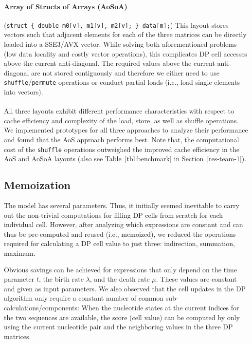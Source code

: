 \documentclass[runningheads,a4paper]{llncs}
\begin{document}
\paragraph*{Array of Structs of Arrays (AoSoA)} ({\small\texttt{struct \{ double m0[v],
m1[v], m2[v]; \} data[m];}}) This layout stores vectors such that
adjacent elements for each of the three matrices can be directly loaded into a SSE3/AVX vector. 
While solving both aforementioned problems (low data locality and costly vector operations),
this complicates DP cell accesses above the current anti-diagonal.
The required values above the current anti-diagonal are not stored contiguously 
and therefore we either need to use \texttt{shuffle}/\texttt{permute} operations
or conduct partial loads (i.e., load single elements into vectors).

\paragraph*{} All three layouts exhibit different performance characteristics with respect to
cache efficiency and complexity of the load, store, as well as shuffle operations.
We implemented prototypes for all three approaches to analyze their
performance and found that the AoS approach performs best.  
Note that, the computational cost of the \texttt{shuffle} operations outweighed the improved cache efficiency in the AoS and
AoSoA layouts (also see Table~\ref{tbl:benchmark} in Section~\ref{res-team-1}). 


\subsection{Memoization}
\label{ssec:memo}

The \cite{TKF91} model has several parameters. Thus, it initially seemed inevitable to carry out the non-trivial computations for filling DP cells 
from scratch for each individual cell.
However, after analyzing which expressions are constant and can thus be pre-computed and reused (i.e., memoized), 
we reduced the operations required for calculating a DP cell value to just three: indirection, summation, maximum.

Obvious savings can be achieved for expressions that only depend on the time parameter $t$, 
the birth rate $\lambda$, and the death rate $\mu$.
These values are constant and given as input parameters. 
We also observed that the cell updates in the DP algorithm only require a constant number of common sub-calculations/components: 
When the nucleotide states at the current indices for the two sequences are available, 
the score (cell value) can be computed by only using the current nucleotide pair and the 
neighboring values in the three DP matrices.
\end{document}
